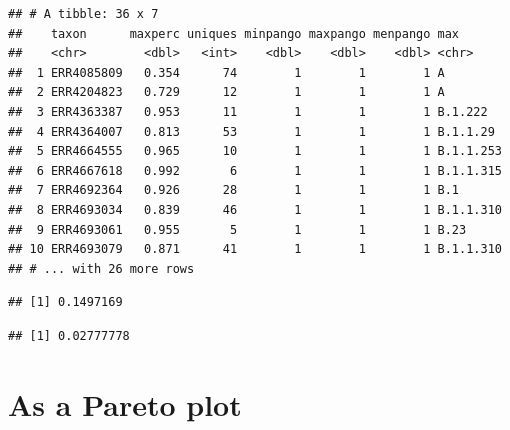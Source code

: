 \documentclass[]{article}
\newenvironment{Shaded}{\begin{snugshade}}{\end{snugshade}}
\newcommand{\DecValTok}[1]{\textcolor[rgb]{0.00,0.00,0.81}{#1}}
\newcommand{\KeywordTok}[1]{\textcolor[rgb]{0.13,0.29,0.53}{\textbf{#1}}}
\newcommand{\NormalTok}[1]{#1}
\newcommand{\OperatorTok}[1]{\textcolor[rgb]{0.81,0.36,0.00}{\textbf{#1}}}
\newcommand{\StringTok}[1]{\textcolor[rgb]{0.31,0.60,0.02}{#1}}
\begin{document}
\begin{verbatim}
## # A tibble: 36 x 7
##    taxon      maxperc uniques minpango maxpango menpango max      
##    <chr>        <dbl>   <int>    <dbl>    <dbl>    <dbl> <chr>    
##  1 ERR4085809   0.354      74        1        1        1 A        
##  2 ERR4204823   0.729      12        1        1        1 A        
##  3 ERR4363387   0.953      11        1        1        1 B.1.222  
##  4 ERR4364007   0.813      53        1        1        1 B.1.1.29 
##  5 ERR4664555   0.965      10        1        1        1 B.1.1.253
##  6 ERR4667618   0.992       6        1        1        1 B.1.1.315
##  7 ERR4692364   0.926      28        1        1        1 B.1      
##  8 ERR4693034   0.839      46        1        1        1 B.1.1.310
##  9 ERR4693061   0.955       5        1        1        1 B.23     
## 10 ERR4693079   0.871      41        1        1        1 B.1.1.310
## # ... with 26 more rows
\end{verbatim}

\begin{Shaded}
\end{Shaded}

\begin{verbatim}
## [1] 0.1497169
\end{verbatim}

\begin{verbatim}
## [1] 0.02777778
\end{verbatim}

\hypertarget{as-a-pareto-plot}{%
\section{As a Pareto plot}\label{as-a-pareto-plot}}
\end{document}
